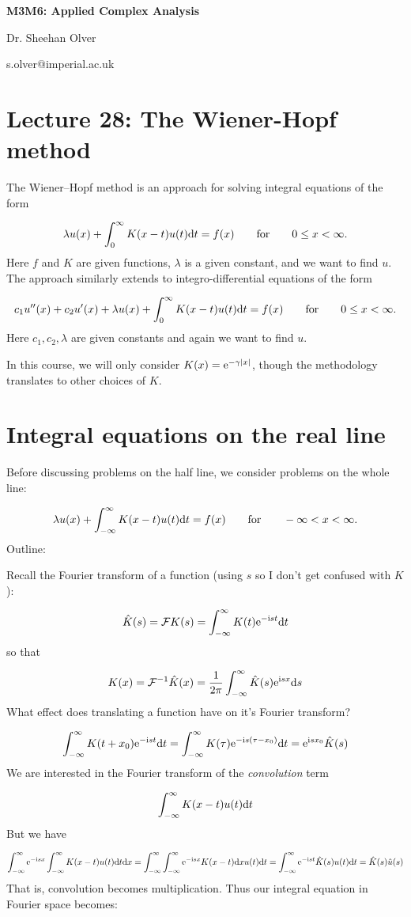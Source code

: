 \documentclass[12pt,a4paper]{article}
\def\qqfor{\qquad\hbox{for}\qquad}
\def\D{ {\rm d} }
\def\I{ {\rm i} }
\def\E{ {\rm e} }
\def\dx{\D x}
\def\dt{\D t}
\def\endash{–}
\begin{document}
\textbf{M3M6: Applied Complex Analysis}

Dr. Sheehan Olver

s.olver@imperial.ac.uk

\section{Lecture 28: The Wiener-Hopf method}
The Wiener\ensuremath{\endash}Hopf method is an approach for solving integral equations of the form

\[
\lambda u(x) + \int_0^\infty K(x-t)u(t) \dt = f(x)\qqfor 0 \leq x < \infty.
\]
Here $f$ and $K$ are given functions, $\lambda$ is a given constant, and we want to find $u$.   The approach similarly extends to integro-differential equations of the form

\[
c_1 u''(x) + c_2 u'(x) + \lambda u(x) + \int_0^\infty K(x-t)u(t) \dt = f(x)\qqfor 0 \leq x < \infty.
\]
Here $c_1, c_2, \lambda$ are given constants and again we want to find $u$.

In this course, we will only consider $K(x) = \E^{-\gamma |x|}$, though the methodology translates to  other choices of $K$.  

\section{Integral equations on the real line}
Before discussing problems on the half line, we consider problems on the whole line:

\[
\lambda u(x) + \int_{-\infty}^\infty K(x-t)u(t) \dt = f(x)\qqfor -\infty < x < \infty.
\]
Outline:

Recall the Fourier transform of a function (using $s$ so I don't get confused with $K$):

\[
    {\hat{K}}(s) = {\cal F} K (s) =  \int_{-\infty}^\infty K(t) \E^{-\I s t} \dt
\]
so that

\[
K(x) = {\cal F}^{-1} \hat K(x) =  {1 \over 2\pi}\int_{-\infty}^\infty \hat K(s) \E^{ \I s x} \D s
\]
What effect does translating a function have on it's Fourier transform? 

\[
\int_{-\infty}^\infty K(t+x_0) \E^{-\I s t} \dt = \int_{-\infty}^\infty K(\tau) \E^{-\I s (\tau - x_0)} \dt = \E^{\I s x_0} \hat K(s)
\]
We are interested in the  Fourier transform of the \emph{convolution} term 

\[
\int_{-\infty}^\infty K(x-t)u(t) \dt 
\]
But we have

\[
\int_{-\infty}^\infty \E^{-\I s x} \int_{-\infty}^\infty K(x-t)u(t) \dt \dx = \int_{-\infty}^\infty \int_{-\infty}^\infty \E^{-\I s x} K(x-t)\dx u(t) \dt =
\int_{-\infty}^\infty \E^{-\I s t} \hat K(s) u(t) \dt = \hat K(s) \hat u(s)
\]
That is, convolution becomes multiplication. Thus our integral equation in Fourier space becomes:
\end{document}
